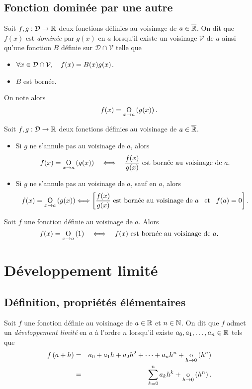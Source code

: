 \documentclass{magnolia}
\begin{document}
\subsection{Fonction dominée par une autre}

\begin{definition}[utile=-3]
Soit $f,g:\mathcal{D}\to\mathbb{R}$ deux fonctions définies au voisinage de $a\in\overline{\mathbb{R}}$. On dit
que $f(x)$ est \emph{dominée} par $g(x)$ en $a$ lorsqu'il existe un voisinage $\mathcal{V}$ de $a$ ainsi qu'une fonction $B$ définie sur $\mathcal{D}\cap\mathcal{V}$ telle que
\begin{itemize}
\item $\forall x\in\mathcal{D}\cap\mathcal{V},\quad f(x)=B(x)g(x)$.
\item $B$ est bornée.
\end{itemize}
On note alors
\[f(x)=\underset{x \rightarrow a}{\text{O}}\left(g(x)\right).\]
\end{definition}

\begin{proposition}[utile=-3]
Soit $f,g:\mathcal{D}\to\mathbb{R}$ deux fonctions définies au voisinage de $a\in\overline{\mathbb{R}}$.
\begin{itemize}
\item Si $g$ ne s'annule pas au voisinage de $a$, alors
  \[f(x)=\underset{x \rightarrow a}{\text{O}}\left(g(x)\right) \quad\Longleftrightarrow\quad
    \frac{f(x)}{g(x)} \text{ est bornée au voisinage de $a$.}\]
\item Si $g$ ne s'annule pas au voisinage de $a$, sauf en $a$, alors
  \[f(x)=\underset{x \rightarrow a}{\text{O}}\left(g(x)\right) \Longleftrightarrow
    \left[\frac{f(x)}{g(x)}\text{ est bornée au voisinage de $a$}
    \quad\!\text{et}\quad\! f(a)=0\right].\]
\end{itemize}
\end{proposition}

\begin{proposition}[utile=-3]
Soit $f$ une fonction définie au voisinage de $a$. Alors
\[f(x)=\underset{x \rightarrow a}{\text{O}}\left(1\right) \quad\Longleftrightarrow\quad
  f(x)\text{ est bornée au voisinage de $a$}.\]
\end{proposition}

\section{Développement limité}
\subsection{Définition, propriétés élémentaires}

\begin{definition}[utile=-3]
Soit $f$ une fonction définie au voisinage de $a\in\mathbb{R}$ et $n\in\mathbb{N}$. On dit
que $f$ admet un \emph{développement limité} en $a$ à l'ordre $n$ lorsqu'il
existe $a_0,a_1,\ldots,a_n\in\mathbb{R}$ tels que
\begin{eqnarray*}
f\left(a+h\right) &=& a_0+a_1 h+a_2 h^2+\cdots+a_n h^n+\underset{h \rightarrow 0}{\text{o}}\left(h^n\right)\\
         &=& \sum_{k=0}^n a_k h^k+\underset{h \rightarrow 0}{\text{o}}\left(h^n\right).
\end{eqnarray*}
\end{definition}
\end{document}

